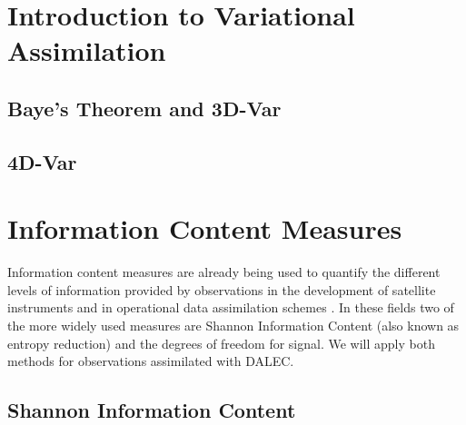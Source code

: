 \documentclass[11pt]{article}
\begin{document}
\section{Introduction to Variational Assimilation}

\subsection{Baye's Theorem and 3D-Var}

\subsection{4D-Var}

\section{Information Content Measures}

Information content measures are already being used to quantify the different levels of information provided by observations in the development of satellite instruments \cite{stewart2008correlated, engelen2004information} and in operational data assimilation schemes \cite{trove22713308, fisher2003estimation, sandu2012practical}. In these fields two of the more widely used measures are Shannon Information Content (also known as entropy reduction) and the degrees of freedom for signal. We will apply both methods for observations assimilated with DALEC. 

\subsection{Shannon Information Content}
\end{document}
